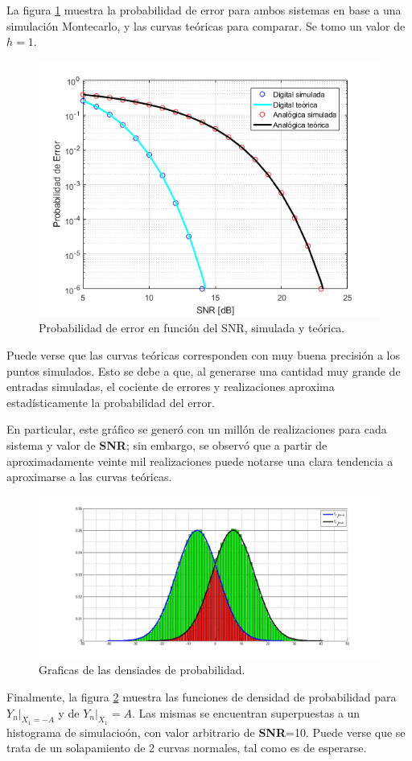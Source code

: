 La figura \ref{fig:mc_h1} muestra la probabilidad de error para ambos sistemas en base a una simulación Montecarlo, y las curvas teóricas para comparar. Se tomo un valor de $h=1$.

\begin{figure}[H]
    \centering
    \includegraphics[width=\textwidth]{./Matlab/ej4h=1n=1meg.png}
    \caption{Probabilidad de error en función del SNR, simulada y teórica. }
\label{fig:mc_h1}
\end{figure}

Puede verse que las curvas teóricas corresponden con muy buena precisión a los puntos simulados. Esto se debe a que, al generarse una cantidad muy grande de entradas simuladas, el cociente de errores y realizaciones aproxima estadísticamente la probabilidad del error.

En particular, este gráfico se generó con un millón de realizaciones para cada sistema y valor de \textbf{SNR}; sin embargo, se observó que a partir de aproximadamente veinte mil realizaciones puede notarse una clara tendencia a aproximarse a las curvas teóricas. 

\begin{figure}[H]
	\centering
	\includegraphics[width=\textwidth]{./Matlab/pdfs}
	\caption{Graficas de las densiades de probabilidad. }
	\label{fig:pdfs}
\end{figure}

Finalmente, la figura \ref{fig:pdfs} muestra las funciones de densidad de probabilidad para $Y_n|_{X_1=-A}$ y de $Y_n|_{X_1}=A$. Las mismas se encuentran superpuestas a un histograma de simulacioón, con valor arbitrario de \textbf{SNR}=10. Puede verse que se trata de un solapamiento de 2 curvas normales, tal como es de esperarse.